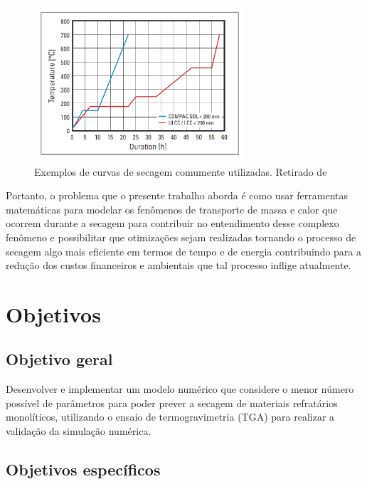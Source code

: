     \begin{figure}[ht]
        \centering
        \includegraphics[width=0.7\textwidth]{figures/hucs.pdf}
        \caption{Exemplos de curvas de secagem comumente utilizadas. Retirado de \cite{rhi}}
        \label{fig:hucs}
   \end{figure}

   Portanto, o problema que o presente trabalho aborda é como usar ferramentas
   matemáticas para modelar os fenômenos de transporte de massa e calor que
   ocorrem durante a secagem para contribuir no entendimento desse complexo
   fenômeno e possibilitar que otimizações sejam realizadas tornando o processo
   de secagem algo mais eficiente em termos de tempo e de energia contribuindo
   para a redução dos custos financeiros e ambientais que tal processo inflige
   atualmente.

   
\section{Objetivos}
    \subsection{Objetivo geral}
        
    Desenvolver e implementar um modelo numérico que considere o menor número possível de parâmetros para poder prever a secagem de materiais refratários monolíticos, utilizando o ensaio de termogravimetria (TGA) para realizar a validação da simulação numérica.
        
    \subsection{Objetivos específicos}
        
